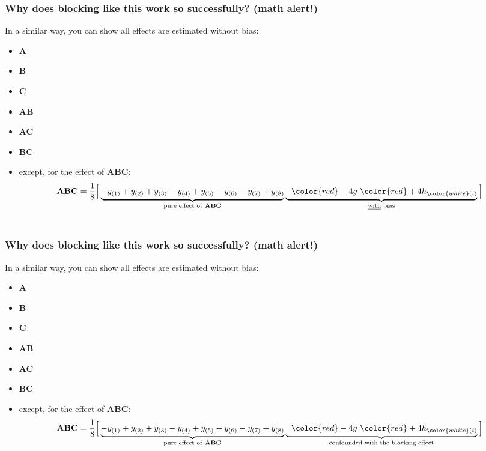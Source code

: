 \documentclass[handout,11pt,aspectratio=169,mathserif]{beamer}
\begin{document}
\begin{frame}\frametitle{Why does blocking like this work so successfully? (math alert!)}
	
	\vspace{1cm}
	In a similar way, you can show all effects are estimated without bias:
	\begin{itemize}
		\item	\textbf{A}
		\item	\textbf{B}
		\item	\textbf{C}
		\item	\textbf{AB}
		\item	\textbf{AC}
		\item	\textbf{BC}
		
		\vspace{1cm}
		\item	except, for the effect of \textbf{ABC}:
			\begin{align*}
			\mathbf{ABC} &= \dfrac{1}{8} \Big[  \underbrace{-y_{(1)} + y_{(2)} +  y_{(3)} - y_{(4)} + y_{(5)} - y_{(6)} - y_{(7)} + y_{(8)}}_{\mathclap{\text{pure effect of \textbf{ABC}}}} \underbrace{\,\,\,\,{\color{red}-4g} \,\, {\color{red}+ 4h_{\color{white}(i)}}}_{\mathclap{\text{\emph{with} bias}}}	 \Big]\\	
			\\
			\end{align*}
	\end{itemize}
\end{frame}

\begin{frame}\frametitle{Why does blocking like this work so successfully? (math alert!)}
	
	\vspace{1cm}
	In a similar way, you can show all effects are estimated without bias:
	\begin{itemize}
		\item	\textbf{A}
		\item	\textbf{B}
		\item	\textbf{C}
		\item	\textbf{AB}
		\item	\textbf{AC}
		\item	\textbf{BC}
		
		\vspace{1cm}
		\item	except, for the effect of \textbf{ABC}:
			\begin{align*}
			\mathbf{ABC} &= \dfrac{1}{8} \Big[  \underbrace{-y_{(1)} + y_{(2)} +  y_{(3)} - y_{(4)} + y_{(5)} - y_{(6)} - y_{(7)} + y_{(8)}}_{\mathclap{\text{pure effect of \textbf{ABC}}}} \underbrace{\,\,\,\,{\color{red}-4g} \,\, {\color{red}+ 4h_{\color{white}(i)}}}_{\mathclap{\text{confounded with the blocking effect}}}	 \Big]\\	
			\\
			\end{align*}
	\end{itemize}
\end{frame}
\end{document}
